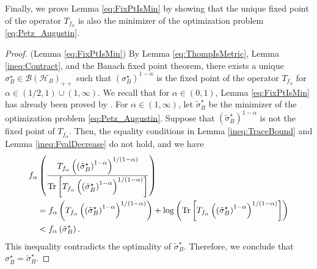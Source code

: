\documentclass{article}
\newtheorem{lemma}[theorem]{Lemma}
\begin{document}
Finally, we prove Lemma \ref{eq:FixPtIsMin} by showing that the unique fixed point of the operator $T_{f_{\alpha}}$ is also the minimizer of the optimization problem \eqref{eq:Petz_Augustin}.
\begin{proof}(Lemma \ref{eq:FixPtIsMin})
    By Lemma \ref{eq:ThompIsMetric},  Lemma \ref{ineq:Contract}, and the Banach fixed point theorem, there exists a unique $\sigma_B^{\star}\in\mathcal{B}\left(\mathcal{H}_B\right)_{++}$ such that $\left(\sigma_B^{\star}\right)^{1-\alpha}$ is the fixed point of the operator $T_{f_{\alpha}}$ for $\alpha\in(1/2,1)\cup(1,\infty)$.
    We recall that for $\alpha\in(0,1)$, Lemma \ref{eq:FixPtIsMin} has already been proved by \citet[Proposition 2(b)]{Cheng2019}.
    For $\alpha\in(1,\infty)$, let $\tilde{\sigma}_B^{\star}$ be the minimizer of the optimization problem \eqref{eq:Petz_Augustin}.
    Suppose that $\left(\tilde{\sigma}_B^{\star}\right)^{1-\alpha}$ is not the fixed point of $T_{f_{\alpha}}$.
    Then, the equality conditions in Lemma \ref{ineq:TraceBound} and Lemma \ref{ineq:FvalDecrease} do not hold, and we have 
    \begin{align}
        &f_{\alpha}\left(\frac{T_{f_{\alpha}}\left(\left(\tilde{\sigma}_B^{\star}\right)^{1-\alpha}\right)^{1/(1-\alpha)}}{\Tr\left[T_{f_{\alpha}}\left(\left(\tilde{\sigma}_B^{\star}\right)^{1-\alpha}\right)^{1/(1-\alpha)}\right]}\right)\\
        &\quad=f_{\alpha}\left(T_{f_{\alpha}}\left(\left(\tilde{\sigma}_B^{\star}\right)^{1-\alpha}\right)^{1/(1-\alpha)}\right)+\log\left(\Tr\left[T_{f_{\alpha}}\left(\left(\tilde{\sigma}_B^{\star}\right)^{1-\alpha}\right)^{1/(1-\alpha)}\right]\right)\\
        &\quad<f_{\alpha}\left(\tilde{\sigma}_B^{\star}\right).
    \end{align}
    This inequality contradicts the optimality of $\tilde{\sigma}_B^{\star}$.
    Therefore, we conclude that $\sigma_B^{\star}=\tilde{\sigma}_B^{\star}$.
\end{proof}
\end{document}
